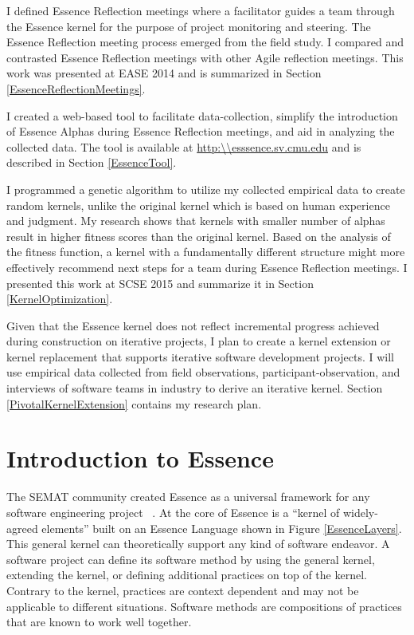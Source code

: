 \documentclass[preprint,12pt,3p]{elsarticle}
\begin{document}
I defined Essence Reflection meetings where a facilitator guides a team through the Essence kernel for the purpose of project monitoring and steering. The Essence Reflection meeting process emerged from the field study. I compared and contrasted Essence Reflection meetings with other Agile reflection meetings. This work was presented at EASE 2014 \cite{EASE2014} and is summarized in Section \ref{EssenceReflectionMeetings}.

I created a web-based tool to facilitate data-collection, simplify the introduction of Essence Alphas during Essence Reflection meetings, and aid in analyzing the collected data. The tool is available at \url{http:\\esssence.sv.cmu.edu} and is described in Section \ref{EssenceTool}.

I programmed a genetic algorithm to utilize my collected empirical data to create random kernels, unlike the original kernel which is based on human experience and judgment. My research shows that kernels with smaller number of alphas result in higher fitness scores than the original kernel. Based on the analysis of the fitness function, a kernel with a fundamentally different structure might more effectively recommend next steps for a team during Essence Reflection meetings. I presented this work at SCSE 2015 and summarize it in Section \ref{KernelOptimization}.

Given that the Essence kernel does not reflect incremental progress achieved during construction on iterative projects, I plan to create a kernel extension or kernel replacement that supports iterative software development projects. I will use empirical data collected from field observations, participant-observation, and interviews of software teams in industry to derive an iterative kernel. Section \ref{PivotalKernelExtension} contains my research plan.

\section{Introduction to Essence}
\label{Method}

The SEMAT community created Essence as a universal framework for any software engineering project ~\cite{JacobsonQueue}. At the core of Essence is a ``kernel of widely-agreed elements'' built on an Essence Language shown in Figure \ref{EssenceLayers}. This general kernel can theoretically support any kind of software endeavor. A software project can define its software method by using the general kernel, extending the kernel, or defining additional practices on top of the kernel. Contrary to the kernel, practices are context dependent and may not be applicable to different situations. Software methods are compositions of practices that are known to work well together.
\end{document}
